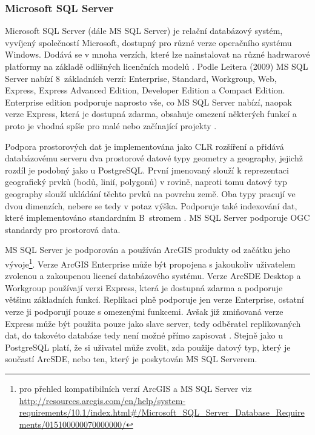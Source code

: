         \subsubsection{Microsoft SQL Server}
        \label{MSSQL}
Microsoft SQL Server (dále MS SQL Server) je relační databázový systém, vyvíjený společností Microsoft, dostupný pro různé verze operačního systému Windows. Dodává se v mnoha verzích, které lze nainstalovat na různé hadrwarové platformy na základě odlišných licenčních modelů \citep{Whalen2008}. Podle Leitera (2009) MS SQL Server nabízí 8~základních verzí: Enterprise, Standard, Workgroup, Web, Express, Express Advanced Edition, Developer Edition a Compact Edition. Enterprise edition podporuje naprosto vše, co MS SQL Server nabízí, naopak verze Express, která je dostupná zdarma, obsahuje omezení některých funkcí a proto je vhodná spíše pro malé nebo začínající projekty \citep{Leiter2009}.

Podpora prostorových dat je implementována jako CLR rozšíření a přidává databázovému serveru dva prostorové datové typy geometry a geography, jejichž rozdíl je podobný jako u PostgreSQL. První jmenovaný slouží k reprezentaci geografický prvků (bodů, linií, polygonů) v rovině, naproti tomu datový typ geography slouží ukládání těchto prvků na povrchu země. Oba typy pracují ve dvou dimenzích, nebere se tedy v potaz výška. Podporuje také indexování dat, které implementováno standardním B~stromem \citep{Cincura2009}. MS SQL Server podporuje OGC standardy pro prostorová data.

MS SQL Server je podporován a používán ArcGIS produkty od začátku jeho vývoje\footnote{pro přehled kompatibilních verzí ArcGIS a MS SQL Server viz \url{http://resources.arcgis.com/en/help/system-requirements/10.1/index.html\#/Microsoft\_SQL\_Server\_Database\_Requirements/015100000070000000/}}. Verze ArcGIS Enterprise může být propojena s jakoukoliv uživatelem zvolenou a zakoupenou licencí databázového systému. Verze ArcSDE Desktop a Workgroup používají verzi Express, která je dostupná zdarma a podporuje většinu základních funkcí. Replikaci plně podporuje jen verze Enterprise, ostatní verze ji podporují pouze s omezenými funkcemi. Avšak již zmiňovaná verze Express může být použita pouze jako slave server, tedy odběratel replikovaných dat, do takovéto databáze tedy není možné přímo zapisovat \citep{Whalen2008}. Stejně jako u PostgreSQL platí, že si uživatel může zvolit, zda použije datový typ, který je součastí ArcSDE, nebo ten, který je poskytován MS SQL Serverem.

